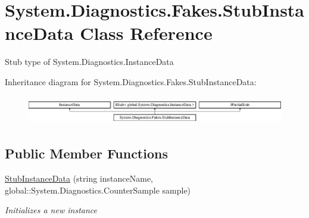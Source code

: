 \hypertarget{class_system_1_1_diagnostics_1_1_fakes_1_1_stub_instance_data}{\section{System.\-Diagnostics.\-Fakes.\-Stub\-Instance\-Data Class Reference}
\label{class_system_1_1_diagnostics_1_1_fakes_1_1_stub_instance_data}
}


Stub type of System.\-Diagnostics.\-Instance\-Data 


Inheritance diagram for System.\-Diagnostics.\-Fakes.\-Stub\-Instance\-Data\-:\begin{figure}[H]
\begin{center}
\leavevmode
\includegraphics[height=1.261261cm]{class_system_1_1_diagnostics_1_1_fakes_1_1_stub_instance_data}
\end{center}
\end{figure}
\subsection*{Public Member Functions}
\begin{DoxyCompactItemize}
\item 
\hyperlink{class_system_1_1_diagnostics_1_1_fakes_1_1_stub_instance_data_ada3467e8ee17c480a0ccc42f62944d17}{Stub\-Instance\-Data} (string instance\-Name, global\-::\-System.\-Diagnostics.\-Counter\-Sample sample)
\begin{DoxyCompactList}\small\item\em Initializes a new instance\end{DoxyCompactList}\end{DoxyCompactItemize}
